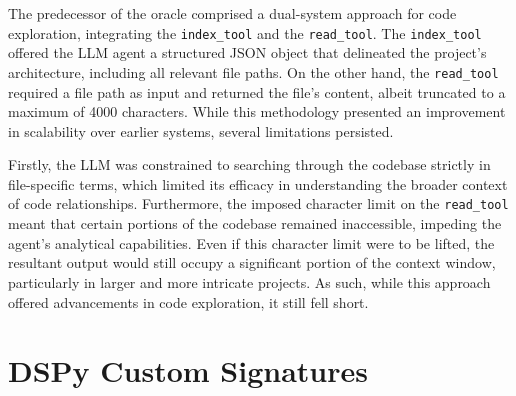 \documentclass[
  a4paper,
]{scrreprt}
\theoremstyle{definition}
\theoremstyle{remark}
\begin{document}
\begin{enumerate}
  The predecessor of the oracle comprised a dual-system approach for
  code exploration, integrating the \texttt{index\_tool} and the
  \texttt{read\_tool}. The \texttt{index\_tool} offered the LLM agent a
  structured JSON object that delineated the project's architecture,
  including all relevant file paths. On the other hand, the
  \texttt{read\_tool} required a file path as input and returned the
  file's content, albeit truncated to a maximum of 4000 characters.
  While this methodology presented an improvement in scalability over
  earlier systems, several limitations persisted.

  Firstly, the LLM was constrained to searching through the codebase
  strictly in file-specific terms, which limited its efficacy in
  understanding the broader context of code relationships. Furthermore,
  the imposed character limit on the \texttt{read\_tool} meant that
  certain portions of the codebase remained inaccessible, impeding the
  agent's analytical capabilities. Even if this character limit were to
  be lifted, the resultant output would still occupy a significant
  portion of the context window, particularly in larger and more
  intricate projects. As such, while this approach offered advancements
  in code exploration, it still fell short.
\end{enumerate}

\chapter{DSPy Custom Signatures}\label{sec-signatures}
\end{document}
